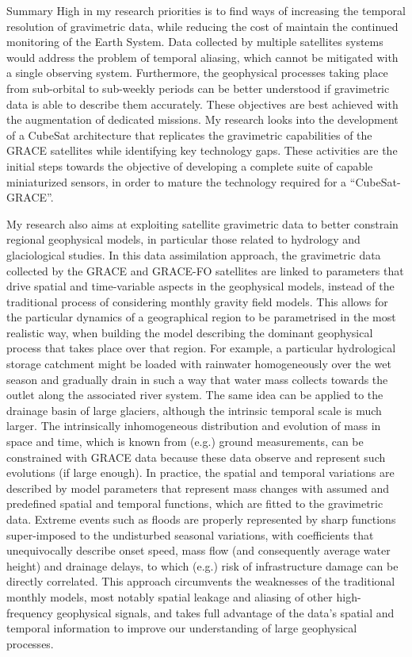 \begin{cvtext}{Summary}
High in my research priorities is to find ways of increasing the temporal resolution of gravimetric data, while reducing the cost of maintain the continued monitoring of the Earth System.
Data collected by multiple satellites systems would address the problem of temporal aliasing, which cannot be mitigated with a single observing system. 
Furthermore, the geophysical processes taking place from sub-orbital to sub-weekly periods can be better understood if gravimetric data is able to describe them accurately. 
These objectives are best achieved with the augmentation of dedicated missions. 
My research looks into the development of a CubeSat architecture that replicates the gravimetric capabilities of the \ac{GRACE} satellites while identifying key technology gaps. 
These activities are the initial steps towards the objective of developing a complete suite of capable miniaturized sensors, in order to mature the technology required for a \enquote{CubeSat-GRACE}.

My research also aims at exploiting satellite gravimetric data to better constrain regional geophysical models, in particular those related to hydrology and glaciological studies.
In this data assimilation approach, the gravimetric data collected by the \ac{GRACE} and \ac{GRACE-FO} satellites are linked to parameters that drive spatial and time-variable aspects in the geophysical models, instead of the traditional process of considering monthly gravity field models.
This allows for the particular dynamics of a geographical region to be parametrised in the most realistic way, when building the model describing the dominant geophysical process that takes place over that region.
For example, a particular hydrological storage catchment might be loaded with rainwater homogeneously over the wet season and gradually drain in such a way that water mass collects towards the outlet along the associated river system.
The same idea can be applied to the drainage basin of large glaciers, although the intrinsic temporal scale is much larger.
The intrinsically inhomogeneous distribution and evolution of mass in space and time, which is known from (\ac{e.g.}) ground measurements, can be constrained with \ac{GRACE} data because these data observe and represent such evolutions (if large enough).
In practice, the spatial and temporal variations are described by model parameters that represent mass changes with assumed and predefined spatial and temporal functions, which are fitted to the gravimetric data. 
Extreme events such as floods are properly represented by sharp functions super-imposed to the undisturbed seasonal variations, with coefficients that unequivocally describe onset speed, mass flow (and consequently average water height) and drainage delays, to which (\ac{e.g.}) risk of infrastructure damage can be directly correlated.
This approach circumvents the weaknesses of the traditional monthly models, most notably spatial leakage and aliasing of other high-frequency geophysical signals, and takes full advantage of the data's spatial and temporal information to improve our understanding of large geophysical processes. 


\end{cvtext}
